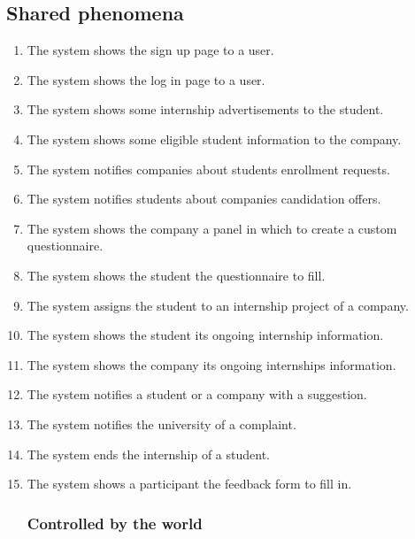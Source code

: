 \subsection{Shared phenomena}

\begin{enumerate}[label=\textbf{SP\arabic* -}]

\subsubsection{Controlled by the machine}

    \item The system shows the sign up page to a user.
    \item The system shows the log in page to a user.
    \item The system shows some internship advertisements to the student.
    \item The system shows some eligible student information to the company.
    \item The system notifies companies about students enrollment requests.
    \item The system notifies students about companies candidation offers.
    \item The system shows the company a panel in which to create a custom questionnaire.
    \item The system shows the student the questionnaire to fill.
    \item The system assigns the student to an internship project of a company.
    \item The system shows the student its ongoing internship information.
    \item The system shows the company its ongoing internships information.
    \item The system notifies a student or a company with a suggestion.
    \item The system notifies the university of a complaint.
    \item The system ends the internship of a student.
    \item The system shows a participant the feedback form to fill in.

\subsubsection{Controlled by the world}


\end{enumerate}
